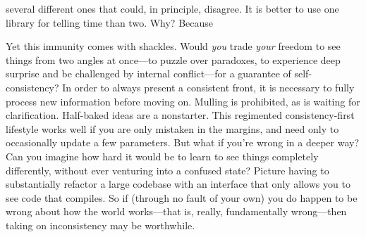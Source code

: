 %
several different ones that could, in principle, disagree. 
It is better to use one library for telling time than two.
Why?
Because 
%

Yet this immunity comes with shackles.
Would \emph{you} trade \emph{your} freedom to see things from two angles at once---to puzzle over paradoxes, to experience deep surprise and be challenged by internal conflict---for a guarantee of self-consistency?
%
In order to always present a consistent front, it is necessary to fully process new information before moving on. Mulling is prohibited, as
is waiting for clarification.
Half-baked ideas are a nonstarter.
This regimented consistency-first lifestyle works well if you are only mistaken in the margins, and need only to occasionally update a few parameters.
But what if you're wrong in a deeper way?
Can you imagine how hard it would be to learn to see things completely differently, without ever venturing into a confused state?
Picture having to substantially refactor a large codebase with an interface that only allows you to see code that compiles.
So if (through no fault of your own) you do happen to be wrong about how the world works---that is, really, fundamentally wrong---then taking on inconsistency may be worthwhile.


